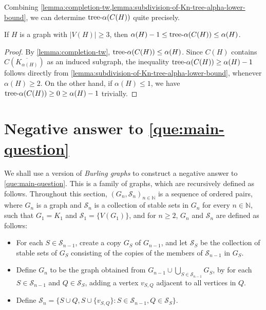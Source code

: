 \documentclass[a4paper, cleveref, autoref, thm-restate]{lipics-v2021}
\newcommand{\treea}{{\rm tree}\textnormal{-}\alpha}
\begin{document}
Combining \cref{lemma:completion-tw,lemma:subdivision-of-Kn-tree-alpha-lower-bound}, we can determine $\treea(C(H))$ quite precisely.

\begin{lemma}\label{lemma:completion-treea}
    If $H$ is a graph with $|V(H)| \geq 3$, then $\alpha(H)-1 \leq \treea(C(H)) \leq \alpha(H)$.
\end{lemma}
% 
\begin{proof}
    By \cref{lemma:completion-tw}, $\treea(C(H)) \leq \alpha(H)$.
    Since $C(H)$ contains $C(\overline{K_{\alpha(H)}})$ as an induced subgraph, the inequality $\treea(C(H)) \geq \alpha(H)-1$ follows directly from \cref{lemma:subdivision-of-Kn-tree-alpha-lower-bound}, whenever $\alpha(H) \geq 2$.
    On the other hand, if $\alpha(H) \leq 1$, we have $\treea(C(H)) \geq 0 \geq \alpha(H)-1$ trivially.
\end{proof}

\section{Negative answer to \cref{que:main-question}} \label{sec:solution}

We shall use a version of \emph{Burling graphs} \cite{burling1965coloring} to construct a negative answer to \cref{que:main-question}.
This is a family of graphs, which are recursively defined as follows.
Throughout this section, $(G_{n}, \mathcal{S}_{n})_{n \in {\mathbb N}}$ is a sequence of ordered pairs, where $G_{n}$ is a graph and $\mathcal{S}_{n}$ is a collection of stable sets in $G_n$ for every $n \in {\mathbb N}$, such that $G_{1} = K_{1}$ and $\mathcal{S}_{1} = \{V(G_{1})\}$, and for $n \geq 2$, $G_n$ and $\mathcal{S}_n$ are defined as follows:
\begin{itemize}
  \item For each $S \in \mathcal{S}_{n-1}$, create a copy $G_{S}$ of $G_{n-1}$, and let $\mathcal{S}_S$ be the collection of stable sets of $G_S$ consisting of the copies of the members of $\mathcal{S}_{n-1}$ in $G_S$.
  \item Define $G_n$ to be the graph obtained from $G_{n-1} \cup \bigcup_{S \in \mathcal{S}_{n-1}}G_S$, by for each $S \in \mathcal{S}_{n-1}$ and $Q \in \mathcal{S}_{S}$, adding a vertex $v_{S,Q}$ adjacent to all vertices in $Q$.
  \item Define $\mathcal{S}_{n} = \{S \cup Q, S \cup \{v_{S,Q}\}: S \in \mathcal{S}_{n-1}, Q \in \mathcal{S}_S\}$. 
\end{itemize}
\end{document}
